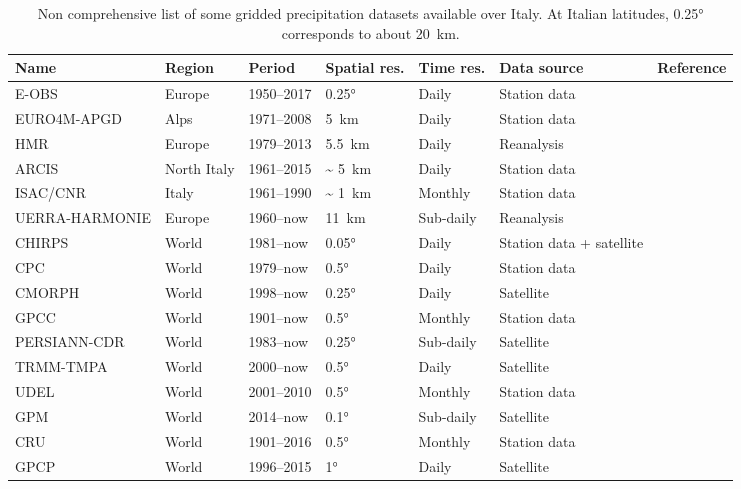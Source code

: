 \begin{table}
\centering
\begin{tabular}{@{}m{2.2cm}m{1.9cm}m{1.8cm}m{1.2cm}m{1.7cm}m{2.2cm}m{3.7cm}@{}}
\toprule
Name         & Region      & Period     & Spatial res.  & Time res. & Data source  & Reference \\ \midrule
E-OBS        & Europe      & 1950--2017 & \ang{0.25}          & Daily     & Station data & \citet{Haylock2008} \\
EURO4M-APGD  & Alps        & 1971--2008 & \SI{5}{\kilo\metre} & Daily     & Station data & \citet{Isotta2014} \\
HMR          & Europe      & 1979--2013 & \SI{5.5}{\kilo\metre} & Daily   & Reanalysis   & \citet{Landelius2016} \\
ARCIS        & North Italy & 1961--2015 & \textasciitilde{} \SI{5}{\kilo\metre} & Daily     & Station data & \citet{Pavan2018} \\
ISAC/CNR     & Italy       & 1961--1990 & \textasciitilde{} \SI{1}{\kilo\metre} & Monthly   & Station data & \citet{Crespi2018} \\
UERRA-HARMONIE & Europe      & 1960--now  &\SI{11}{\kilo\metre} & Sub-daily & Reanalysis    & \citet{Ridal2017} \\
CHIRPS       & World       & 1981--now  & \ang{0.05}          & Daily     & Station data + satellite & \citet{Funk2015} \\
CPC          & World       & 1979--now  & \ang{0.5}           & Daily     & Station data & \citet{Chen2008a} \\
CMORPH       & World       & 1998--now  & \ang{0.25}          & Daily     & Satellite    & \citet{Joyce2004} \\
GPCC         & World       & 1901--now  & \ang{0.5}           & Monthly   & Station data & \citet{Schneider2014} \\
PERSIANN-CDR & World       & 1983--now  & \ang{0.25}          & Sub-daily & Satellite    & \citet{Ashouri2015} \\
TRMM-TMPA    & World       & 2000--now  & \ang{0.5}           & Daily     & Satellite    & \citet{Huffman2007} \\
UDEL         & World       & 2001--2010 & \ang{0.5}           & Monthly   & Station data & \citet{Willmott2001} \\
GPM          & World       & 2014--now  & \ang{0.1}           & Sub-daily & Satellite    & \citet{Hou2014} \\
CRU          & World       & 1901--2016 & \ang{0.5}           & Monthly   & Station data & \citet{Harris2014} \\
GPCP         & World       & 1996--2015 & \ang{1}             & Daily     & Satellite    & \citet{Adler2018} \\ \bottomrule
\end{tabular}\caption[List of gridded precipitation datasets over Italy]{Non comprehensive list of some gridded precipitation datasets available over Italy. At Italian latitudes, \ang{0.25} corresponds to about \SI{20}{\kilo\meter}.}\label{tab:prec_obs_ita}
\end{table}

